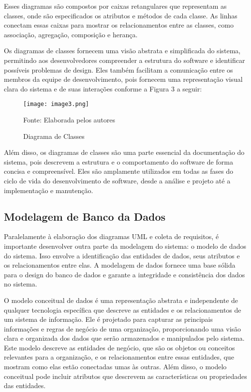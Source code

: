 \documentclass[12pt]{article}
\begin{document}
Esses diagramas são compostos por caixas retangulares que representam as classes, onde são especificados os atributos e métodos de cada classe. As linhas conectam essas caixas para mostrar os relacionamentos entre as classes, como associação, agregação, composição e herança.

Os diagramas de classes fornecem uma visão abstrata e simplificada do sistema, permitindo aos desenvolvedores compreender a estrutura do software e identificar possíveis problemas de design. Eles também facilitam a comunicação entre os membros da equipe de desenvolvimento, pois fornecem uma representação visual clara do sistema e de suas interações conforme a Figura 3 a seguir:

\begin{figure}[H]
	\centering
	\texttt{[image: image3.png]}
	\caption{Diagrama de Classes}
	\label{fig:diagrama_classes}
	\small Fonte: Elaborada pelos autores
\end{figure}


Além disso, os diagramas de classes são uma parte essencial da documentação do sistema, pois descrevem a estrutura e o comportamento do software de forma concisa e compreensível. Eles são amplamente utilizados em todas as fases do ciclo de vida do desenvolvimento de software, desde a análise e projeto até a implementação e manutenção.

\subsection{Modelagem de Banco da Dados}

Paralelamente à elaboração dos diagramas UML e coleta de requisitos, é importante desenvolver outra parte da modelagem do sistema: o modelo de dados do sistema. Isso envolve a identificação das entidades de dados, seus atributos e os relacionamentos entre elas. A modelagem de dados fornece uma base sólida para o design do banco de dados e garante a integridade e consistência dos dados no sistema.

O modelo conceitual de dados é uma representação abstrata e independente de qualquer tecnologia específica que descreve as entidades e os relacionamentos de um sistema de informação. Ele é projetado para capturar as principais informações e regras de negócio de uma organização, proporcionando uma visão clara e organizada dos dados que serão armazenados e manipulados pelo sistema. Este modelo descreve as entidades de negócio, que são os objetos ou conceitos relevantes para a organização, e os relacionamentos entre essas entidades, que mostram como elas estão conectadas umas às outras. Além disso, o modelo conceitual pode incluir atributos que descrevem as características ou propriedades das entidades.
\end{document}
